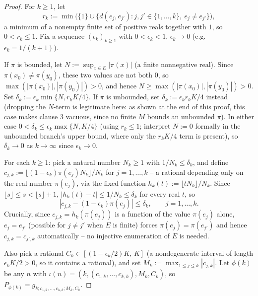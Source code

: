 \begin{proof}
  For $k \ge 1$, let
  \[
    r_k := \min\bigl(\{1\} \cup \{ d(e_j,e_{j'}) : j,j' \in \{1,\dots,k\},\ e_j \ne e_{j'}\}\bigr)
    ,
  \]
  a minimum of a nonempty finite set of positive reals together with $1$, so $0 < r_k \le 1$.
  Fix a sequence $(\epsilon_k)_{k\ge1}$ with $0 < \epsilon_k < 1$, $\epsilon_k \to 0$ (e.g.\
  $\epsilon_k = 1/(k+1)$).

  If $\pi$ is bounded, let $N := \sup_{x \in E} |\pi(x)|$ (a finite nonnegative real). Since
  $\pi(x_0) \ne \pi(y_0)$, these two values are not both $0$, so $\max(|\pi(x_0)|,|\pi(y_0)|) > 0$,
  and hence $N \ge \max(|\pi(x_0)|,|\pi(y_0)|) > 0$. Set $\delta_k := \epsilon_k \min\{N, r_kK/4\}$. If $\pi$ is unbounded, set $\delta_k := \epsilon_k r_k K/4$ instead (dropping
  the $N$-term is legitimate here: as shown at the end of this proof, this case makes clause 3
  vacuous, since no finite $M$ bounds an unbounded $\pi$). In either case $0 < \delta_k \le
  \epsilon_k \max\{N, K/4\}$ (using $r_k \le 1$; interpret $N := 0$ formally in the unbounded
  branch's upper bound, where only the $r_kK/4$ term is present), so $\delta_k \to 0$ as $k \to
  \infty$ since $\epsilon_k \to 0$.

  For each $k \ge 1$: pick a natural number $N_k \ge 1$ with $1/N_k \le \delta_k$, and define $c_{j,k}
  := \lfloor (1-\epsilon_k)\pi(e_j) N_k \rfloor / N_k$ for $j = 1,\dots,k$ -- a rational depending
  only on the real number $\pi(e_j)$, via the fixed function $h_k(t) := \lfloor t N_k \rfloor/N_k$.
  Since $\lfloor s \rfloor \le s < \lfloor s\rfloor+1$, $|h_k(t)-t| \le 1/N_k \le \delta_k$ for every
  real $t$, so
  \begin{equation}\label{eq:approx}
    |c_{j,k} - (1-\epsilon_k)\pi(e_j)| \le \delta_k
    , \qquad j=1,\dots,k
    .
  \end{equation}
  Crucially, since $c_{j,k} = h_k(\pi(e_j))$ is a function of the value $\pi(e_j)$ alone, $e_j =
  e_{j'}$ (possible for $j \ne j'$ when $E$ is finite) forces $\pi(e_j)=\pi(e_{j'})$ and hence
  $c_{j,k}=c_{j',k}$ automatically -- no injective enumeration of $E$ is needed.

  Also pick a rational $C_k \in [(1-\epsilon_k/2)K,\,K]$ (a nondegenerate interval of length
  $\epsilon_kK/2 > 0$, so it contains a rational), and set $M_k := \max_{1\le j\le k}|c_{j,k}|$.
  Let $\phi(k)$ be any $n$ with $\iota(n) = (k,(c_{1,k},\dots,c_{k,k}),M_k,C_k)$, so $P_{\phi(k)} =
  g_{k;c_{1,k},\dots,c_{k,k};M_k,C_k}$.


\end{proof}
